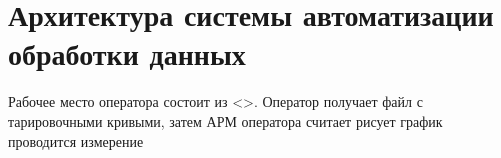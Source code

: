 \section{Архитектура системы автоматизации обработки данных}\label{subsect2_5}

Рабочее место оператора состоит из <>. Оператор получает файл с тарировочными кривыми, затем АРМ оператора считает рисует график проводится измерение
\clearpage